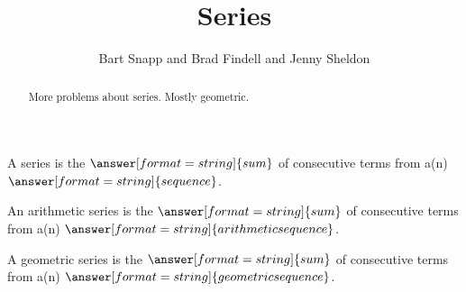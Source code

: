 \documentclass[nooutcomes]{ximera}
\title{Series}
\author{Bart Snapp and Brad Findell and Jenny Sheldon}
\begin{document}
\begin{abstract}
More problems about series.  Mostly geometric. 
\end{abstract}
\maketitle



\begin{problem}
A series is the $\answer[format=string]{sum}$ of consecutive terms from a(n) $\answer[format=string]{sequence}$.  

An arithmetic series is the $\answer[format=string]{sum}$ of consecutive terms from a(n) $\answer[format=string]{arithmetic sequence}$.  

A geometric series is the $\answer[format=string]{sum}$ of consecutive terms from a(n) $\answer[format=string]{geometric sequence}$.  
\end{problem}
\end{document}
